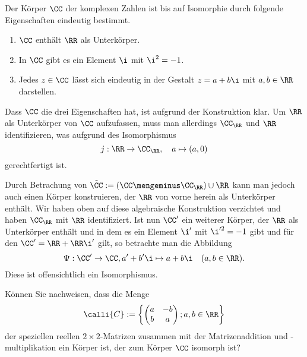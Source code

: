 \begin{antwort}
Der Körper $\CC$ der komplexen Zahlen ist bis auf Isomorphie durch folgende 
Eigenschaften eindeutig bestimmt. 
\begin{enumerate}
\item $\CC$ enthält $\RR$ als Unterkörper.
\item In $\CC$ gibt es ein Element $\i$ mit $\i^2=-1$.
\item Jedes $z\in\CC$ lässt sich eindeutig in der Gestalt 
$z=a+b\i$ mit $a,b\in\RR$ darstellen. 
\end{enumerate}

Dass $\CC$ die drei Eigenschaften hat, ist aufgrund der Konstruktion 
klar. Um $\RR$ als Unterkörper von $\CC$ aufzufassen, muss man allerdings 
$\CC_{\RR}$ und $\RR$ identifizieren, was aufgrund des Isomorphismus
\[
j : \RR\to \CC_{\RR}, \quad a\mapsto (a,0)
\]
gerechtfertigt ist.

Durch Betrachung von $\tilde{\CC}:=(\CC \mengeminus \CC_{\RR} ) \cup \RR$ 
kann man jedoch auch einen Körper konstruieren, der $\RR$ von vorne herein 
als Unterkörper enthält. Wir haben oben auf diese algebraische Konstruktion 
verzichtet und haben $\CC_{\RR}$ mit $\RR$ identifiziert. 
Ist nun $\CC'$ ein weiterer Körper, der $\RR$ als Unterkörper enthält und 
in dem es ein Element $\i'$ mit $\i'^2 = -1$ gibt und für den 
$\CC' = \RR + \RR\i'$ gilt, so betrachte man die Abbildung 
\[
\Psi : \CC' \to \CC, a'+b'\i \mapsto a+b\i\quad(a,b\in\RR).
\]
Diese ist offensichtlich ein Isomorphismus.
\end{antwort}

\begin{frage}
Können Sie nachweisen, dass die Menge 
\[
\calli{C} := \left\{ \begin{pmatrix} a & -b \\ b & a \end{pmatrix} ; 
a,b \in \RR \right\}
\]
der speziellen reellen $2\times 2$-Matrizen zusammen mit der Matrizenaddition 
und -multiplikation ein Körper ist, der zum Körper $\CC$ isomorph ist?
\end{frage}

